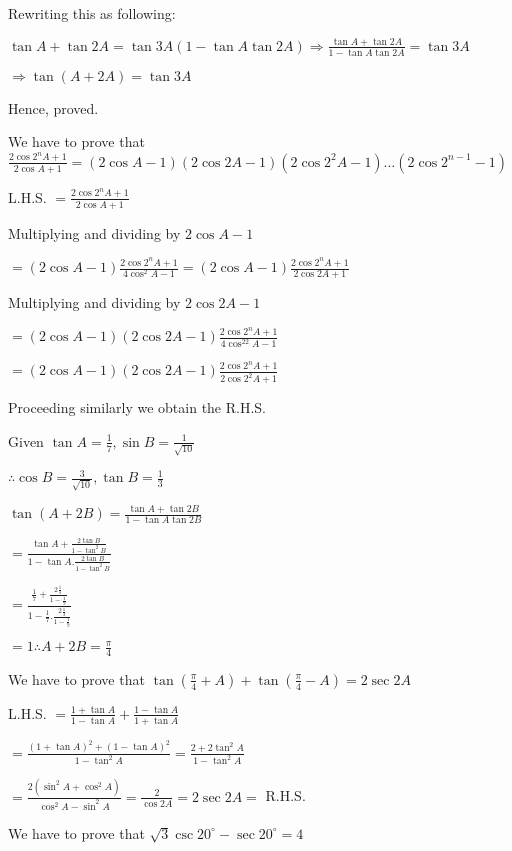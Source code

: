   Rewriting this as following:

  $\tan A + \tan 2A = \tan 3A(1 - \tan A\tan 2A)\Rightarrow \frac{\tan A + \tan 2A}{1 - \tan A\tan 2A} = \tan 3A$

  $\Rightarrow \tan (A + 2A) = \tan 3A$

  Hence, proved.

\item We have to prove that $\frac{2\cos2^nA + 1}{2\cos A + 1} = (2\cos A - 1)(2\cos 2A - 1)(2\cos2^2A - 1)\ldots(2\cos2^{n -
  1} - 1)$

  L.H.S. $= \frac{2\cos2^nA + 1}{2\cos A + 1}$

  Multiplying and dividing by $2\cos A - 1$

  $= (2\cos A - 1)\frac{2\cos2^nA + 1}{4\cos^2A - 1} = (2\cos A - 1)\frac{2\cos2^nA + 1}{2\cos2A + 1}$

  Multiplying and dividing by $2\cos2A - 1$

  $= (2\cos A - 1)(2\cos2A - 1)\frac{2\cos2^nA + 1}{4\cos^22A - 1}$

  $= (2\cos A - 1)(2\cos2A - 1)\frac{2\cos2^nA + 1}{2\cos2^2A + 1}$

  Proceeding similarly we obtain the R.H.S.

\item Given $\tan A= \frac{1}{7}, \sin B = \frac{1}{\sqrt{10}}$

  $\therefore \cos B = \frac{3}{\sqrt{10}}, \tan B = \frac{1}{3}$

  $\tan(A + 2B) = \frac{\tan A + \tan 2B}{1 - \tan A\tan 2B}$

  $= \frac{\tan A + \frac{2\tan B}{1 - \tan^2B}}{1 - \tan A.\frac{2\tan B}{1 - \tan^2B}}$

  $= \frac{\frac{1}{7} + \frac{2\frac{1}{3}}{1 - \frac{1}{9}}}{1 - \frac{1}{7}.\frac{2\frac{1}{3}}{1 - \frac{1}{9}}}$

  $= 1 \therefore A + 2B = \frac{\pi}{4}$

\item We have to prove that $\tan\left(\frac{\pi}{4} + A\right) + \tan\left(\frac{\pi}{4} - A\right) = 2\sec2A$

  L.H.S. $= \frac{1 + \tan A}{1 - \tan A} + \frac{1 - \tan A}{1 + \tan A}$

  $= \frac{(1 + \tan A)^2 + (1 - \tan A)^2}{1 - \tan^2A} = \frac{2 + 2\tan^2A}{1 - \tan^2A}$

  $= \frac{2(\sin^2A + \cos^2A)}{\cos^2A - \sin^2A} = \frac{2}{\cos 2A} = 2\sec 2A =$ R.H.S.

\item We have to prove that $\sqrt{3}\csc 20^\circ - \sec 20^\circ = 4$

